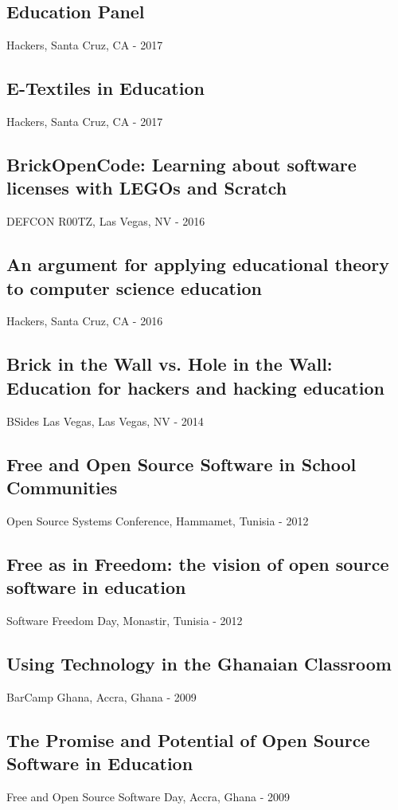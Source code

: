 \documentclass[../main.tex]{subfiles}
\begin{document}
\subsection*{Education Panel}
     Hackers, Santa Cruz, CA - 2017


\subsection*{E-Textiles in Education}
     Hackers, Santa Cruz, CA - 2017


	\subsection*{BrickOpenCode: Learning about software licenses with LEGOs and Scratch}
     DEFCON R00TZ, Las Vegas, NV - 2016


\subsection*{An argument for applying educational theory to computer science education}
     Hackers, Santa Cruz, CA - 2016


	\subsection*{Brick in the Wall vs. Hole in the Wall: Education for hackers and hacking education}
     BSides Las Vegas, Las Vegas, NV - 2014


	\subsection*{Free and Open Source Software in School Communities}
     Open Source Systems Conference, Hammamet, Tunisia - 2012


	\subsection*{Free as in Freedom: the vision of open source software in education}
     Software Freedom Day, Monastir, Tunisia - 2012


	\subsection*{Using Technology in the Ghanaian Classroom}
     BarCamp Ghana, Accra, Ghana - 2009


	\subsection*{The Promise and Potential of Open Source Software in Education}
     Free and Open Source Software Day, Accra, Ghana - 2009
\end{document}
